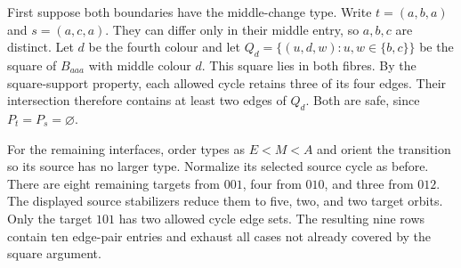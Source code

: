 First suppose both boundaries have the middle-change type. Write
$t=(a,b,a)$ and $s=(a,c,a)$. They can differ only in their middle
entry, so $a,b,c$ are distinct. Let $d$ be the fourth colour and let
$Q_d=\{(u,d,w):u,w\in\{b,c\}\}$ be the square of $B_{aaa}$
with middle colour $d$. This square lies in both fibres. By the
square-support property, each allowed cycle retains three of its
four edges. Their intersection therefore contains at least two
edges of $Q_d$. Both are safe, since $P_t=P_s=\varnothing$.

For the remaining interfaces, order types as $E<M<A$ and orient
the transition so its source has no larger type. Normalize its
selected source cycle as before. There are eight remaining targets
from $001$, four from $010$, and three from $012$. The displayed
source stabilizers reduce them to five, two, and two target orbits.
Only the target $101$ has two allowed cycle edge sets. The resulting
nine rows contain ten edge-pair entries and exhaust all cases not
already covered by the square argument.
